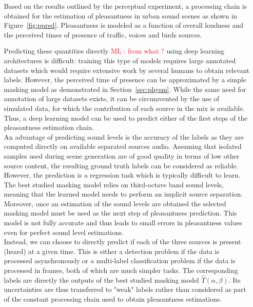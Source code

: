 \documentclass[11pt,a4paper]{article}
\newcommand{\ml}[1]{\textcolor{red}{ML : #1}}
\begin{document}
Based on the results outlined by the perceptual experiment, a processing chain is obtained for the estimation of pleasantness in urban sound scenes as shown in Figure~\ref{fig:ppred}. Pleasantness is modeled as a function of overall loudness and the perceived times of presence of traffic, voices and birds sources.

Predicting these quantities directly \ml{from what ?} using deep learning architectures is difficult: training this type of models requires large annotated datasets which would require extensive work by several humans to obtain relevant labels. However, the perceived time of presence can be approximated by a simple masking model as demonstrated in Section~\ref{sec:physm}. While the same need for annotation of large datasets exists, it can be circumvented by the use of simulated data, for which the contribution of each source in the mix is available. Thus, a deep learning model can be used to predict either of the first steps of the pleasantness estimation chain.\\

An advantage of predicting sound levels is the accuracy of the labels as they are computed directly on available separated sources audio. Assuming that isolated samples used during scene generation are of good quality in terms of low other source content, the resulting ground truth labels can be considered as reliable. However, the prediction is a regression task which is typically difficult to learn. The best studied masking model relies on third-octave band sound levels, meaning that the learned model needs to perform an implicit source separation. Moreover, once an estimation of the sound levels are obtained the selected masking model must be used as the next step of pleasantness prediction. This model is not fully accurate and thus leads to small errors in pleasantness values even for perfect sound level estimations.\\

Instead, we can choose to directly predict if each of the three sources is present (heard) at a given time. This is either a detection problem if the data is processed asynchronously or a multi-label classification problem if the data is processed in frames, both of which are much simpler tasks. The corresponding labels are directly the outputs of the best studied masking model $\hat T(\alpha, \beta)$. Its uncertainties are thus transferred to "weak" labels rather than considered as part of the constant processing chain used to obtain pleasantness estimations.\\
\end{document}
